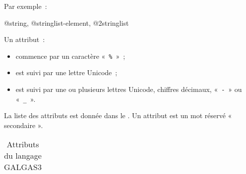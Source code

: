 Par exemple~:
\begin{galgas3}
 @string, @stringlist-element, @2stringlist
\end{galgas3}






Un attribut~:
\begin{itemize}
  \item commence par un caractère «~\texttt{\%}~»~;
  \item est suivi par une lettre Unicode~;
  \item est suivi par une ou plusieurs lettres Unicode, chiffres décimaux, «~\texttt{-}~» ou «~\texttt{\_}~».
\end{itemize}

La liste des attributs est donnée dans le . Un attribut est un mot réservé « secondaire ».

\begin{table}[ht]
  \centering
  \begin{tabular}{llllllll}
    
  \end{tabular}
  \caption{Attributs du langage GALGAS3}
\end{table}



